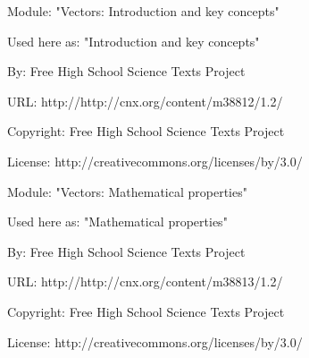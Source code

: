       \par\vspace{9pt}\noindent\begin{minipage}{\textwidth}
      Module: "Vectors: Introduction and key concepts" \par\nopagebreak\noindent
      Used here as: "Introduction and key concepts" \par\nopagebreak\noindent
        By: Free High School Science Texts Project\par\nopagebreak\noindent
      URL: http://http://cnx.org/content/m38812/1.2/\par\nopagebreak\noindent
      \par\nopagebreak\noindent
      Copyright: Free High School Science Texts Project\par\nopagebreak\noindent
      License:  http://creativecommons.org/licenses/by/3.0/\par\nopagebreak\noindent
      \par\end{minipage}
      \par\vspace{9pt}\noindent\begin{minipage}{\textwidth}
      Module: "Vectors: Mathematical properties" \par\nopagebreak\noindent
      Used here as: "Mathematical properties" \par\nopagebreak\noindent
        By: Free High School Science Texts Project\par\nopagebreak\noindent
      URL: http://http://cnx.org/content/m38813/1.2/\par\nopagebreak\noindent
      \par\nopagebreak\noindent
      Copyright: Free High School Science Texts Project\par\nopagebreak\noindent
      License:  http://creativecommons.org/licenses/by/3.0/\par\nopagebreak\noindent
      \par\end{minipage}
